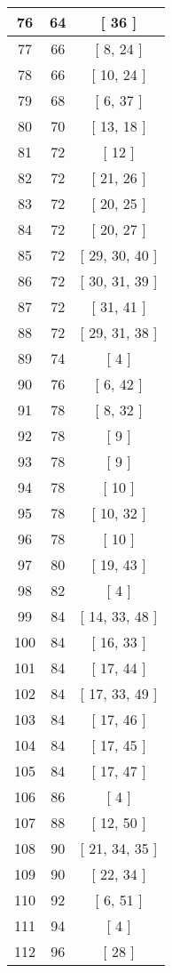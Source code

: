 \begin{center}
\begin{longtable}[H]{|| c c c ||}
\\\hline
76 & 64 & [ 36 ]
\\\hline
77 & 66 & [ 8, 24 ]
\\\hline
78 & 66 & [ 10, 24 ]
\\\hline
79 & 68 & [ 6, 37 ]
\\\hline
80 & 70 & [ 13, 18 ]
\\\hline
81 & 72 & [ 12 ]
\\\hline
82 & 72 & [ 21, 26 ]
\\\hline
83 & 72 & [ 20, 25 ]
\\\hline
84 & 72 & [ 20, 27 ]
\\\hline
85 & 72 & [ 29, 30, 40 ]
\\\hline
86 & 72 & [ 30, 31, 39 ]
\\\hline
87 & 72 & [ 31, 41 ]
\\\hline
88 & 72 & [ 29, 31, 38 ]
\\\hline
89 & 74 & [ 4 ]
\\\hline
90 & 76 & [ 6, 42 ]
\\\hline
91 & 78 & [ 8, 32 ]
\\\hline
92 & 78 & [ 9 ]
\\\hline
93 & 78 & [ 9 ]
\\\hline
94 & 78 & [ 10 ]
\\\hline
95 & 78 & [ 10, 32 ]
\\\hline
96 & 78 & [ 10 ]
\\\hline
97 & 80 & [ 19, 43 ]
\\\hline
98 & 82 & [ 4 ]
\\\hline
99 & 84 & [ 14, 33, 48 ]
\\\hline
100 & 84 & [ 16, 33 ]
\\\hline
101 & 84 & [ 17, 44 ]
\\\hline
102 & 84 & [ 17, 33, 49 ]
\\\hline
103 & 84 & [ 17, 46 ]
\\\hline
104 & 84 & [ 17, 45 ]
\\\hline
105 & 84 & [ 17, 47 ]
\\\hline
106 & 86 & [ 4 ]
\\\hline
107 & 88 & [ 12, 50 ]
\\\hline
108 & 90 & [ 21, 34, 35 ]
\\\hline
109 & 90 & [ 22, 34 ]
\\\hline
110 & 92 & [ 6, 51 ]
\\\hline
111 & 94 & [ 4 ]
\\\hline
112 & 96 & [ 28 ]
\\\hline

\end{longtable}
\end{center}
